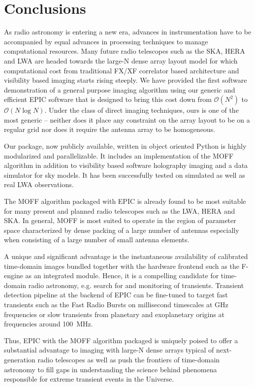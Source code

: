 \documentclass[a4paper,fleqn,usenatbib]{../mnras}
\begin{document}
\section{Conclusions}\label{sec:conclusions}

As radio astronomy is entering a new era, advances in instrumentation have to
be accompanied by equal advances in processing techniques to manage 
computational resources. Many future radio telescopes such as the SKA, HERA and 
LWA are headed towards the large-N dense array layout model for which 
computational cost from traditional FX/XF correlator based architecture and 
visibility based imaging starts rising steeply. We have provided the first 
software demonstration of a general purpose imaging algorithm using our generic 
and efficient EPIC software that is designed to bring this cost down from 
$\mathcal{O}(N^2)$ to $\mathcal{O}(N\log N)$. Under the class of direct imaging 
techniques, ours is one of the most generic -- neither does it place any 
constraint on the array layout to be on a regular grid nor does it require the
antenna array to be homogeneous. 

Our package, now publicly available, written in object oriented Python is 
highly modularized and parallelizable. It includes an implementation of the 
MOFF algorithm in addition to visibility based software holography imaging and 
a data simulator for sky models. It has been successfully tested on simulated 
as well as real LWA observations. 

The MOFF algorithm packaged with EPIC is already found to be most suitable 
for many present and planned radio telescopes such as the LWA, HERA and SKA. 
In general, MOFF is most suited to operate in the region of parameter space
characterized by dense packing of a large number of antennas especially when 
consisting of a large number of small antenna elements. 

A unique and significant advantage is the instantaneous availability of 
calibrated time-domain images bundled together with the hardware frontend 
such as the F-engine as an integrated module. Hence, it is a compelling 
candidate for time-domain radio astronomy, e.g. search for and monitoring of 
transients. Transient detection pipeline at the backend of EPIC can be 
fine-tuned to target fast transients such as the Fast Radio Bursts 
\citep[FRB;][]{tho13} on millisecond timescales at GHz frequencies or slow 
transients from planetary and exoplanetary origins at frequencies around 
100~MHz. 

Thus, EPIC with the MOFF algorithm packaged is uniquely poised to offer a
substantial advantage to imaging with large-N dense arrays typical of 
next-generation radio telescopes as well as push the frontiers of 
time-domain astronomy to fill gaps in understanding the science behind 
phenomena responsible for extreme transient events in the Universe.
\end{document}
